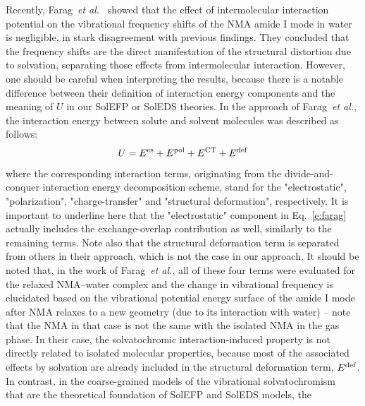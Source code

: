 \documentclass[a4paper,titlepage,twoside,fleqn,12pt]{book}
\begin{document}
\begin{refsection}
Recently, Farag~\emph{et al.}~\citep{Farag.Ruiz-Lopez.Bastida.Monard.Ingrosso.JPCB.2015} 
showed that the effect of intermolecular
interaction potential on the vibrational frequency
shifts of the NMA amide I mode in water is negligible, in
stark disagreement with previous findings.\citep{Blasiak.Lee.Cho.JCP.2013,Blasiak.Cho.JCP.2014} 
They concluded that the frequency shifts are the
direct manifestation of the structural distortion due to solvation,
separating those effects from intermolecular interaction.
However, one should be careful when interpreting the results,
because there is a notable difference between their definition
of interaction energy components and the meaning of $U$ in our
SolEFP or SolEDS theories. In the approach of Farag~\emph{et al.},
the interaction energy between solute and solvent molecules
was described as follows:
%
\begin{equation} \label{e:farag}
 U =  E^{\rm es} + E^{\rm pol} + E^{\rm CT} + E^{\rm def}
\end{equation}
%
where the corresponding interaction terms, originating from
the divide\hyp{}and\hyp{}conquer interaction energy decomposition
scheme,\citep{vanderVaart.Merz.JPCA.1999} 
stand for the "electrostatic", "polarization", "charge\hyp{}transfer"
and "structural deformation", respectively. It is
important to underline here that the "electrostatic" component
in Eq.~\eqref{e:farag} actually includes the exchange\hyp{}overlap contribution
as well, similarly to the remaining terms.\citep{vanderVaart.Merz.JPCA.1999} 
Note also that the
structural deformation term is separated from others in their
approach, which is not the case in our approach. 
It should be noted that, in the work of Farag~\emph{et al.}, 
all of these four terms were evaluated for the relaxed
NMA--water complex and the change in vibrational frequency
is elucidated based on the vibrational potential energy surface
of the amide I mode after NMA relaxes to a new geometry (due
to its interaction with water) -- note that the NMA in that case
is not the same with the isolated NMA in the gas phase. In their
case, the solvatochromic interaction\hyp{}induced property is not
directly related to isolated molecular properties, because most
of the associated effects by solvation are already included in
the structural deformation term, $E^{\rm def}$. In contrast, in the coarse\hyp{}grained
models of the vibrational solvatochromism~\citep{Buckingham.ProcRSocLondonA.1958,
Buckingham.ProcRSocLondonA.1960,
Buckingham.TransFaradaySoc.1960,
Cho.JCP.2003,Cho.JCP.2009} 
that are
the theoretical foundation of SolEFP and SolEDS models, the

\end{refsection}
\end{document}
